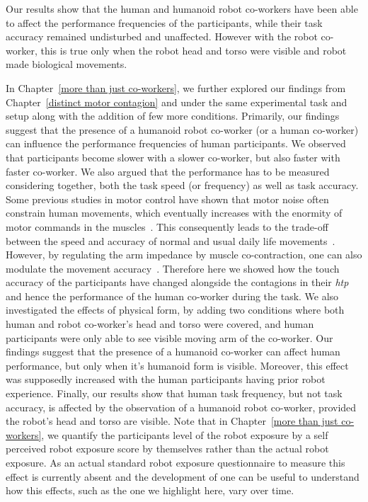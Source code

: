 Our results show that the human and humanoid robot co-workers have been able to affect the performance frequencies of the participants, while their task accuracy remained undisturbed and unaffected. However with the robot co-worker, this is true only when the robot head and torso were visible and robot made biological movements.






In Chapter~\ref{more than just co-workers}, we further explored our findings from Chapter~\ref{distinct motor contagion} and under the same experimental task and setup along with the addition of few more conditions. Primarily, our findings suggest that the presence of a humanoid robot co-worker (or a human co-worker) can influence the performance frequencies of human participants. We observed that participants become slower with a slower co-worker, but also faster with faster co-worker. We also argued that the performance has to be measured considering together, both the task speed (or frequency) as well as task accuracy. Some previous studies in motor control have shown that motor noise often constrain human movements, which eventually increases with the enormity of motor commands in the muscles~\cite{Harris:Nature:1998}. This consequently leads to the trade-off between the speed and accuracy of normal and usual daily life movements~\cite{Fitts:JEP:1954}. However, by regulating the arm impedance by muscle co-contraction, one can also modulate the movement accuracy~\cite{Burdet:nature:2001, Franklin:JoN:2008, Ganesh:RAS:2013}. Therefore here we showed how the touch accuracy of the participants have changed alongside the contagions in their {\it htp} and hence the performance of the human co-worker during the task. We also investigated the effects of physical form, by adding two conditions where both human and robot co-worker's head and torso were covered, and human participants were only able to see visible moving arm of the co-worker. Our findings suggest that the presence of a humanoid co-worker can affect human performance, but only when it's humanoid form is visible. Moreover, this effect was supposedly increased with the human participants having prior robot experience. Finally, our results show that human task frequency, but not task accuracy, is affected by the observation of a humanoid robot co-worker, provided the robot's head and torso are visible. Note that in Chapter~\ref{more than just co-workers}, we quantify the participants level of the robot exposure by a self perceived robot exposure score by themselves rather than the actual robot exposure. As an actual standard robot exposure questionnaire to measure this effect is currently absent and the development of one can be useful to understand how this effects, such as the one we highlight here, vary over time.

